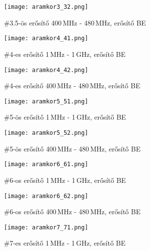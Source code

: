 \begin{figure}[!ht]
	\centering
	\texttt{[image: aramkor3\_32.png]}
	\caption{\#3.5-ös erősítő 400\,MHz - 480\,MHz, erősítő BE}
	\label{fig:meres32}
\end{figure}



\begin{figure}[!ht]
	\centering
	\texttt{[image: aramkor4\_41.png]}
	\caption{\#4-es erősítő 1\,MHz - 1\,GHz, erősítő BE}
	\label{fig:meres41}
\end{figure}

\begin{figure}[!ht]
	\centering
	\texttt{[image: aramkor4\_42.png]}
	\caption{\#4-es erősítő 400\,MHz - 480\,MHz, erősítő BE}
	\label{fig:meres42}
\end{figure}



\begin{figure}[!ht]
	\centering
	\texttt{[image: aramkor5\_51.png]}
	\caption{\#5-ös erősítő 1\,MHz - 1\,GHz, erősítő BE}
	\label{fig:meres51}
\end{figure}

\begin{figure}[!ht]
	\centering
	\texttt{[image: aramkor5\_52.png]}
	\caption{\#5-ös erősítő 400\,MHz - 480\,MHz, erősítő BE}
	\label{fig:meres52}
\end{figure}



\begin{figure}[!ht]
	\centering
	\texttt{[image: aramkor6\_61.png]}
	\caption{\#6-os erősítő 1\,MHz - 1\,GHz, erősítő BE}
	\label{fig:meres61}
\end{figure}

\begin{figure}[!ht]
	\centering
	\texttt{[image: aramkor6\_62.png]}
	\caption{\#6-os erősítő 400\,MHz - 480\,MHz, erősítő BE}
	\label{fig:meres62}
\end{figure}



\begin{figure}[!ht]
	\centering
	\texttt{[image: aramkor7\_71.png]}
	\caption{\#7-es erősítő 1\,MHz - 1\,GHz, erősítő BE}
	\label{fig:meres71}
\end{figure}

